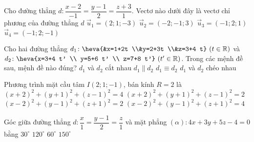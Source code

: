 \begin{ex}%
	Cho đường thẳng $d\colon \dfrac{x-2}{-1}=\dfrac{y-1}{2}=\dfrac{z+3}{1}$. Vectơ nào dưới đây là vectơ chỉ phương của đường thẳng $d$
	\choice
	{$\overrightarrow{u}_1=(2 ; 1 ;-3)$}
	{$\overrightarrow{u}_2=(-2 ;-1 ; 3)$}
	{\True $\overrightarrow{u}_3=(-1 ; 2 ; 1)$}
	{$\overrightarrow{u}_4=(-1 ; 2 ;-1)$}
\end{ex}
\begin{ex}%
	Cho hai đường thẳng $d_1 \colon \heva{&x=1+2t \\&y=2+3t \\&z=3+4 t} \ (t \in \mathbb{R})$ và $d_2 \colon \heva{x=3+4 t' \\ y=5+6 t' \\ z=7+8 t'} \ (t' \in \mathbb{R})$.
	Trong các mệnh đề sau, mệnh đề nào đúng?
	\choice
	{$d_1$ và $d_2$ cắt nhau}
	{$d_1 \parallel d_2$}
	{\True $d_1 \equiv d_2$}
	{$d_1$ và $d_2$ chéo nhau}
\end{ex}
\begin{ex}%
	Phương trình mặt cầu tâm $I(2;1;-1)$, bán kính $R=2$ là
	\choice
	{$(x+2)^2+(y+1)^2+(z-1)^2=4$}
	{$(x+2)^2+(y+1)^2+(z-1)^2=2$}
	{$(x-2)^2+(y-1)^2+(z+1)^2=2$}
	{\True $(x-2)^2+(y-1)^2+(z+1)^2=4$}
\end{ex}
\begin{ex}%
	Góc giữa đường thẳng $d: \dfrac{x}{1}=\dfrac{y-1}{2}=\dfrac{z}{1}$ và mặt phẳng $(\alpha): 4x+3y+5z-4=0$ bằng
	\choice
	{$30^{\circ}$}
	{$120^{\circ}$}
	{\True $60^{\circ}$}
	{$150^{\circ}$}
\end{ex}

